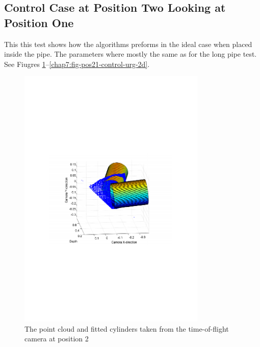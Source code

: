 \subsection{Control Case at Position Two Looking at Position One}
This this test shows how the algorithms preforms in the ideal case when placed inside the
pipe. The parameters where mostly the same as for the long pipe test. See Fiugres
\ref{chap7:fig-pos21-control-tof-3d}--\ref{chap7:fig-pos21-control-urg-2d}.
\begin{figure}[htbp]
    \centering
    \includegraphics[width=0.8\textwidth]{pics/pos21-control-tof-3d}
    \caption{The point cloud and fitted cylinders taken from the time-of-flight camera at
    position 2}
    \label{chap7:fig-pos21-control-tof-3d}
\end{figure}
